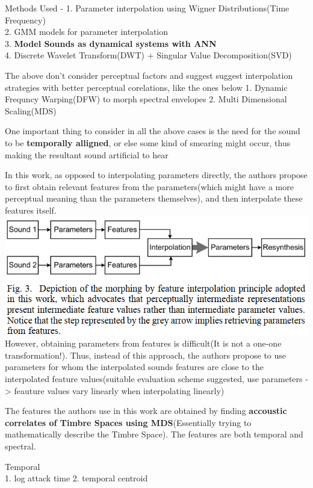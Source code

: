\documentclass[11pt]{article}
\makeatletter
\def\maxwidth{\ifdim\Gin@nat@width>\linewidth\linewidth
    \else\Gin@nat@width\fi}
\let\Oldincludegraphics\includegraphics
\renewcommand{\includegraphics}[1]{\Oldincludegraphics[width=.8\maxwidth]{#1}}
\makeatother
\begin{document}
Methods Used - 1. Parameter interpolation using Wigner
Distributions(Time Frequency)\\
2. GMM models for parameter interpolation\\
3. \textbf{Model Sounds as dynamical systems with ANN}\\
4. Discrete Wavelet Transform(DWT) + Singular Value Decomposition(SVD)

The above don't consider perceptual factors and suggest suggest
interpolation strategies with better perceptual corelations, like the
ones below 1. Dynamic Frequncy Warping(DFW) to morph spectral envelopes
2. Multi Dimensional Scaling(MDS)

One important thing to consider in all the above cases is the need for
the sound to be \textbf{temporally alligned}, or else some kind of
smearing might occur, thus making the resultant sound artificial to hear

    In this work, as opposed to interpolating parameters directly, the
authors propose to first obtain relevant features from the
parameters(which might have a more perceptual meaning than the
parameters themselves), and then interpolate these features itself.\\
\includegraphics{fig_10.PNG} However, obtaining parameters from features
is difficult(It is not a one-one transformation!). Thus, instead of this
approach, the authors propose to use parameters for whom the
interpolated sounds features are close to the interpolated feature
values(suitable evaluation scheme suggested, use parameters
-\textgreater{} feauture values vary linearly when interpolating
linearly)

    The features the authors use in this work are obtained by finding
\textbf{accoustic correlates of Timbre Spaces using MDS}(Essentially
trying to mathematically describe the Timbre Space). The features are
both temporal and spectral.

Temporal\\
1. log attack time 2. temporal centroid
\end{document}
